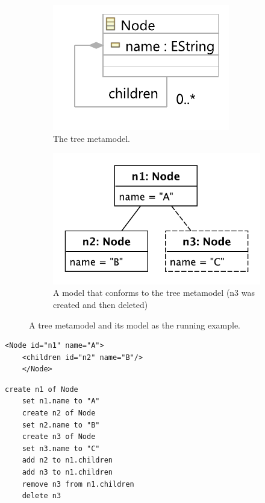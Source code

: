 \documentclass[12pt, a4paper]{report} \usepackage[titletoc]{appendix}
\begin{document}
\begin{figure}[ht]
	\begin{subfigure}[t]{0.4\linewidth}
		\centering
		\includegraphics[width=0.8\linewidth]{node_metamodel}
		\caption{The tree metamodel.}
		\label{fig:tree_metamodel}
	\end{subfigure}
	\hfill
	\begin{subfigure}[t]{0.6\linewidth}
		\centering
		\includegraphics[width=0.6\linewidth]{initial_chart}
		\caption{A model that conforms to the tree metamodel (n3 was created and then deleted)}
		\label{fig:initial_model}
	\end{subfigure}
	\caption{A tree metamodel and its model as the running example.}
	\label{fig:append_speed}
\end{figure}

\noindent
\begin{minipage}[t]{0.5\linewidth}
	\begin{lstlisting}[style=xmi,caption={State-based representation of the tree model in (simplified) XMI.},label=lst:xmimodel]
	<Node id="n1" name="A">
	<children id="n2" name="B"/>
	</Node>
	\end{lstlisting}
\end{minipage}
\hfill
\begin{minipage}[t]{0.5\linewidth}
	\begin{lstlisting}[style=eol,caption={Change-based representation of the tree model.},label=lst:cbpmodel]
	create n1 of Node
	set n1.name to "A"      
	create n2 of Node
	set n2.name to "B"      
	create n3 of Node
	set n3.name to "C"      
	add n2 to n1.children   
	add n3 to n1.children
	remove n3 from n1.children   
	delete n3
	\end{lstlisting}
\end{minipage}
\end{document}

